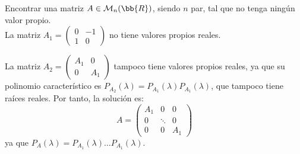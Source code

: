 \begin{ejercicio}
    Encontrar una matriz $A\in \mathcal{M}_n(\bb{R})$, siendo $n$ par, tal que no tenga ningún valor propio.\\

    La matriz $A_1=\left(\begin{array}{cc}
        0 & -1 \\
        1 & 0
    \end{array} \right)$ no tiene valores propios reales.

    La matriz $A_2=\left(\begin{array}{c|c}
        A_1 & 0 \\ \hline
        0 & A_1
    \end{array} \right)$ tampoco tiene valores propios reales, ya que su polinomio característico es $P_{A_2}(\lambda) = P_{A_1}(\lambda)P_{A_1}(\lambda)$, que tampoco tiene raíces reales. Por tanto, la solución es:
    \begin{equation*}
        A = \left(\begin{array}{c|c|c}
            A_1 & 0 & 0 \\ \hline
            0  & \ddots & 0 \\ \hline
            0 & 0 & A_1
        \end{array}\right)
    \end{equation*}
    ya que $P_{A}(\lambda) = P_{A_1}(\lambda)\dots P_{A_1}(\lambda)$.
\end{ejercicio}

